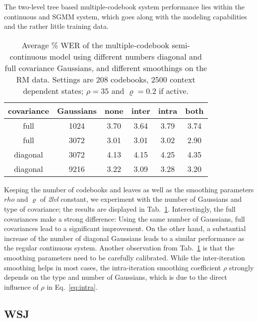 \documentclass{article}
\begin{document}
The two-level tree based multiple-codebook system performance lies within the 
continuous and SGMM system, which goes along with the modeling capabilities 
and the rather little training data. 


\begin{table}%
\begin{center}
\begin{tabular}{|c|c||c|c|c|c|}
\hline
covariance & Gaussians & none & inter & intra & both \\ \hline\hline
full       &      1024 & 3.70 & 3.64 & 3.79 & 3.74 \\ \hline
full       &      3072 & 3.01 & 3.01 & 3.02 & 2.90 \\ \hline\hline
diagonal   &      3072 & 4.13 & 4.15 & 4.25 & 4.35 \\ \hline
diagonal   &      9216 & 3.22 & 3.09 & 3.28 & 3.20 \\ \hline
\end{tabular}
\end{center}
\caption{\label{tab:rm_diagfull}
Average \% WER of the multiple-codebook semi-continuous model using different 
numbers diagonal and full covariance Gaussians, and different smoothings 
on the RM data. 
Settings are 208 codebooks, 2500 context dependent states; $\rho = 35$ 
and $\varrho = 0.2$ if active.
}
\end{table}

Keeping the number of codebooks and leaves as well as the smoothing parameters
$rho$ and $\varrho$ of {\em 2lvl} constant, we experiment with the number of
Gaussians and type of covariance; the results are displayed in 
Tab.~\ref{tab:rm_diagfull}.
Interestingly, the full covariances make a strong difference: Using the same
number of Gaussians, full covariances lead to a significant improvement.
On the other hand, a substantial increase of the number of diagonal Gaussians 
leads to a similar performance as the regular continuous system.
%
Another observation from Tab.~\ref{tab:rm_diagfull} is that the smoothing
parameters need to be carefully calibrated. While the inter-iteration smoothing
helps in most cases, the intra-iteration smoothing coefficient $\rho$ strongly
depends on the type and number of Gaussians, which is due to the direct influence
of $\rho$ in Eq.~\ref{eq:intra}.

\subsection{WSJ}
\end{document}
